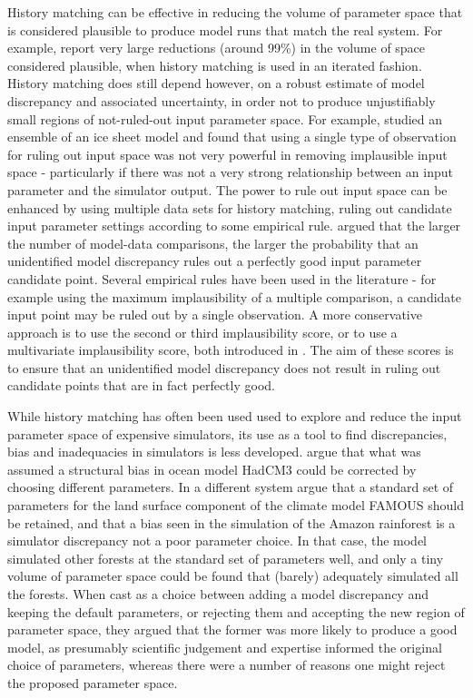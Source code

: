 \documentclass[gmd, manuscript]{copernicus}
\begin{document}
History matching can be effective in reducing the volume of parameter space that is considered plausible to produce model runs that match the real system. For example, \cite{williamson2015identifying} report very large reductions (around 99\%) in the volume of space considered plausible, when history matching is used in an iterated fashion. History matching does still depend however, on a robust estimate of model discrepancy and associated uncertainty, in order not to produce unjustifiably small regions of not-ruled-out input parameter space. For example, \citep{mcneall2013potential} studied an ensemble of an ice sheet model and found that using a single type of observation for ruling out input space was not very powerful in removing implausible input space - particularly if there was not a very strong relationship between an input parameter and the simulator output. The power to rule out input space can be enhanced by using multiple data sets for history matching, ruling out candidate input parameter settings according to some empirical rule. \cite{mcneall2016impact} argued that the larger the number of model-data comparisons, the larger the probability that an unidentified model discrepancy rules out a perfectly good input parameter candidate point. Several empirical rules have been used in the literature - for example using the maximum implausibility of a multiple comparison, a candidate input point may be ruled out by a single observation. A more conservative approach is to use the second or third implausibility score, or to use a multivariate implausibility score, both introduced in \cite{vernon2010galaxy}. The aim of these scores is to ensure that an unidentified model discrepancy does not result in ruling out candidate points that are in fact perfectly good.   

While history matching has often been used used to explore and reduce the input parameter space of expensive simulators, its use as a tool to find discrepancies, bias and inadequacies in simulators is less developed. \cite{williamson2015identifying} argue that what was assumed a structural bias in ocean model HadCM3 could be corrected by choosing different parameters. In a different system \cite{mcneall2016impact} argue that a standard set of parameters for the land surface component of the climate model FAMOUS should be retained, and that a bias seen in the simulation of the Amazon rainforest is a simulator discrepancy not a poor parameter choice. In that case, the model simulated other forests at the standard set of parameters well, and only a tiny volume of parameter space could be found that (barely) adequately simulated all the forests. When cast as a choice between adding a model discrepancy and keeping the default parameters, or rejecting them and accepting the new region of parameter space, they argued that the former was more likely to produce a good model, as presumably scientific judgement and expertise informed the original choice of parameters, whereas there were a number of reasons one might reject the proposed parameter space. 
\end{document}
